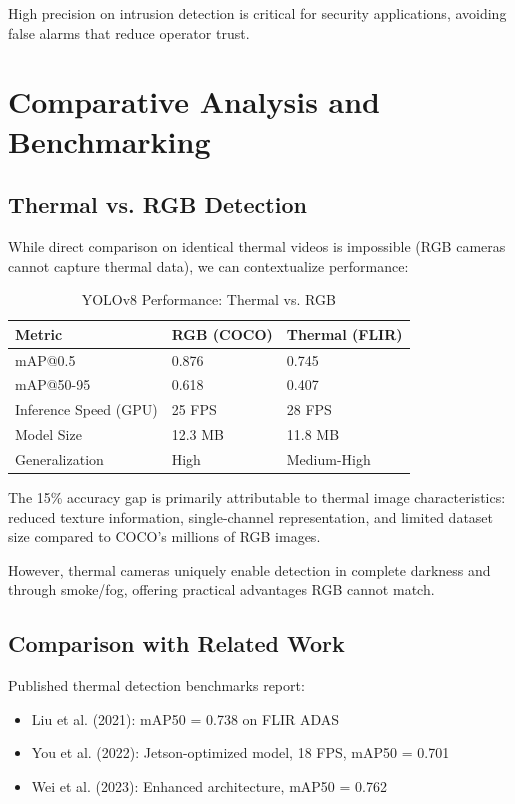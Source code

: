\documentclass[conference]{IEEEtran}
\begin{document}
High precision on intrusion detection is critical for security applications, avoiding false alarms that reduce operator trust.

\section{Comparative Analysis and Benchmarking}

\subsection{Thermal vs. RGB Detection}

While direct comparison on identical thermal videos is impossible (RGB cameras cannot capture thermal data), we can contextualize performance:

\begin{table}[htbp]
\centering
\caption{YOLOv8 Performance: Thermal vs. RGB}
\label{tab:thermal_vs_rgb}
\begin{tabular}{lll}
\toprule
\textbf{Metric} & \textbf{RGB (COCO)} & \textbf{Thermal (FLIR)} \\
\midrule
mAP@0.5 & 0.876 & 0.745 \\
mAP@50-95 & 0.618 & 0.407 \\
Inference Speed (GPU) & 25 FPS & 28 FPS \\
Model Size & 12.3 MB & 11.8 MB \\
Generalization & High & Medium-High \\
\bottomrule
\end{tabular}
\end{table}

The 15\% accuracy gap is primarily attributable to thermal image characteristics: reduced texture information, single-channel representation, and limited dataset size compared to COCO's millions of RGB images.

However, thermal cameras uniquely enable detection in complete darkness and through smoke/fog, offering practical advantages RGB cannot match.

\subsection{Comparison with Related Work}

Published thermal detection benchmarks report:
\begin{itemize}
\item Liu et al. (2021): mAP50 = 0.738 on FLIR ADAS
\item You et al. (2022): Jetson-optimized model, 18 FPS, mAP50 = 0.701
\item Wei et al. (2023): Enhanced architecture, mAP50 = 0.762
\end{itemize}
\end{document}
